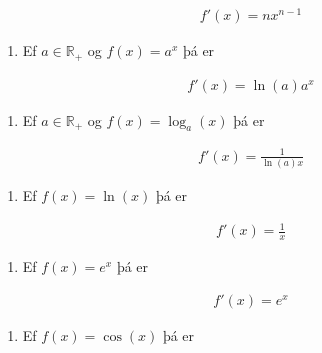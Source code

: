 \documentclass[a4paper,10pt,icelandic]{sphinxmanual}
\begin{document}
\begin{equation*}
\begin{split}f'(x)=nx^{n-1}\end{split}
\end{equation*}\begin{enumerate}
%
\setcounter{enumi}{5}
\item {} 
Ef \(a\in \mathbb{R}_+\) og \(f(x)=a^x\) þá er

\end{enumerate}
\begin{equation*}
\begin{split}f'(x)=\ln(a)a^x\end{split}
\end{equation*}\begin{enumerate}
%
\setcounter{enumi}{6}
\item {} 
Ef \(a\in \mathbb{R}_+\) og \(f(x)=\log_a(x)\) þá er

\end{enumerate}
\begin{equation*}
\begin{split}f'(x)=\frac{1}{\ln(a)x}\end{split}
\end{equation*}\begin{enumerate}
%
\setcounter{enumi}{7}
\item {} 
Ef \(f(x) = \ln(x)\) þá er

\end{enumerate}
\begin{equation*}
\begin{split}f'(x) = \frac{1}{x}\end{split}
\end{equation*}\begin{enumerate}
%
\setcounter{enumi}{8}
\item {} 
Ef \(f(x) = e^x\) þá er

\end{enumerate}
\begin{equation*}
\begin{split}f'(x) = e^x\end{split}
\end{equation*}\begin{enumerate}
%
\setcounter{enumi}{9}
\item {} 
Ef \(f(x)=\cos(x)\) þá er

\end{enumerate}
\end{document}
